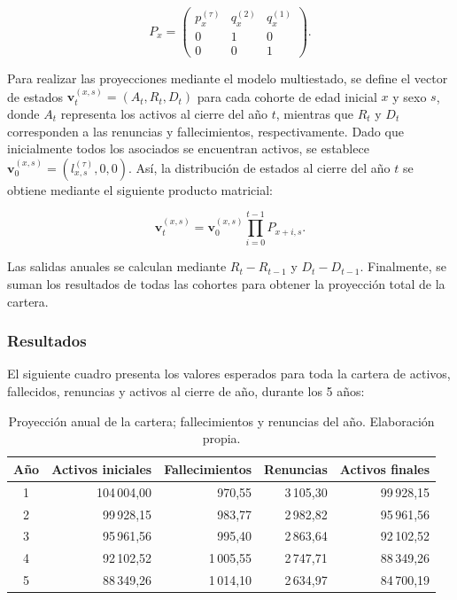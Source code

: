 \documentclass[11pt]{article}
\begin{document}
\vspace{-0.6cm}

\begin{equation}
P_x=
\begin{pmatrix}
p_x^{(\tau)} & q_x^{(2)} & q_x^{(1)}\\
0 & 1 & 0\\
0 & 0 & 1
\end{pmatrix}.
\end{equation}

\vspace{-0.4cm}


Para realizar las proyecciones mediante el modelo multiestado, se define el vector de estados $\mathbf{v}_t^{(x,s)}=(A_t,R_t,D_t)$ para cada cohorte de edad inicial $x$ y sexo $s$, donde $A_t$ representa los activos al cierre del año $t$, mientras que $R_t$ y $D_t$ corresponden a las renuncias y fallecimientos, respectivamente. Dado que inicialmente todos los asociados se encuentran activos, se establece $\mathbf{v}_0^{(x,s)}=(l_{x,s}^{(\tau)},0,0)$. Así, la distribución de estados al cierre del año $t$ se obtiene mediante el siguiente producto matricial:

\vspace{-0.8cm}

\[
\mathbf{v}_t^{(x,s)}=
\mathbf{v}_0^{(x,s)}
\prod_{i=0}^{t-1}P_{x+i,s}.
\]


\vspace{-0.4cm}

Las salidas anuales se calculan mediante
$R_t-R_{t-1}$ y $D_t-D_{t-1}$.
Finalmente, se suman los resultados de todas las
cohortes para obtener la proyección total de la cartera.

\vspace{-0.6cm}

\subsubsection*{Resultados}

\vspace{-0.6cm}

El siguiente cuadro presenta los valores esperados para toda la cartera de activos, fallecidos, renuncias y activos al cierre de año, durante los 5 años:

\begin{table}[htbp]
\centering
\begin{tabular}{crrrr}
\hline
\textbf{Año} & \textbf{Activos iniciales}
& \textbf{Fallecimientos} & \textbf{Renuncias}
& \textbf{Activos finales}\\
\hline
1 & 104\,004,00 & 970,55 & 3\,105,30 & 99\,928,15\\
2 & 99\,928,15 & 983,77 & 2\,982,82 & 95\,961,56\\
3 & 95\,961,56 & 995,40 & 2\,863,64 & 92\,102,52\\
4 & 92\,102,52 & 1\,005,55 & 2\,747,71 & 88\,349,26\\
5 & 88\,349,26 & 1\,014,10 & 2\,634,97 & 84\,700,19\\
\hline
\end{tabular}
\caption{Proyección anual de la cartera; fallecimientos y renuncias del año. Elaboración propia.}
\end{table}
\end{document}
